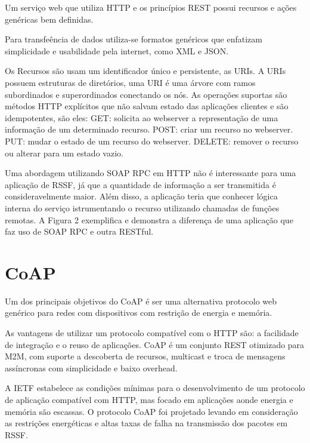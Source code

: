 Um servi\c{c}o web que utiliza HTTP e os princ\'ipios REST possui recursos e a\c{c}\~oes gen\'ericas bem definidas.\cite{rest}

Para transfe\^encia de dados utiliza-se formatos gen\'ericos que enfatizam simplicidade e usabilidade pela internet, como XML e JSON.

Os Recursos s\~ao usam um identificador \'unico e persistente, as URIs. A URIs possuem estruturas de diret\'orios, uma URI \'e uma \'arvore com ramos subordinados e superordinados conectando os n\'os. As opera\c{c}\~oes suportas s\~ao m\'etodos HTTP expl\'icitos que n\~ao salvam estado das aplica\c{c}\~oes clientes e s\~ao idempotentes, s\~ao eles:
GET: solicita ao webserver a representa\c{c}\~ao de uma informa\c{c}\~ao de um determinado recurso.
POST: criar um recurso no webserver.
PUT: mudar o estado de um recurso do webserver.
DELETE: remover o recurso ou alterar para um estado vazio.

Uma abordagem utilizando SOAP RPC em HTTP n\~ao \'e interessante para uma aplica\c{c}\~ao de RSSF, j\'a que a quantidade de informa\c{c}\~ao a ser transmitida \'e consideravelmente maior. Al\'em disso, a aplica\c{c}\~ao teria que conhecer l\'ogica interna do servi\c{c}o istrumentando o recurso utilizando chamadas de fun\c{c}\~oes remotas. A Figura 2 exemplifica e demonstra a diferen\c{c}a de uma aplica\c{c}\~ao que faz uso de SOAP RPC e outra RESTful.\cite{richardson2008restful}


\section{CoAP}

Um dos principais objetivos do CoAP \'e ser uma alternativa protocolo web gen\'erico para redes com dispositivos com restri\c{c}\~ao de energia e mem\'oria.

As vantagens de utilizar um protocolo compat\'ivel com o HTTP s\~ao: a facilidade de integra\c{c}\~ao e o reuso de aplica\c{c}\~oes. CoAP \'e um conjunto REST otimizado para M2M, com suporte a descoberta de recursos, multicast e troca de mensagens ass\'incronas com simplicidade e baixo overhead.

A IETF estabelece as condi\c{c}\~oes m\'inimas para o desenvolvimento de um protocolo de aplica\c{c}\~ao compat\'ivel com HTTP, mas focado em aplica\c{c}\~oes aonde energia e mem\'oria s\~ao escassas. O protocolo CoAP foi projetado levando em considera\c{c}\~ao as restri\c{c}\~oes energ\'eticas e altas taxas de falha na transmiss\~ao dos pacotes em RSSF.


